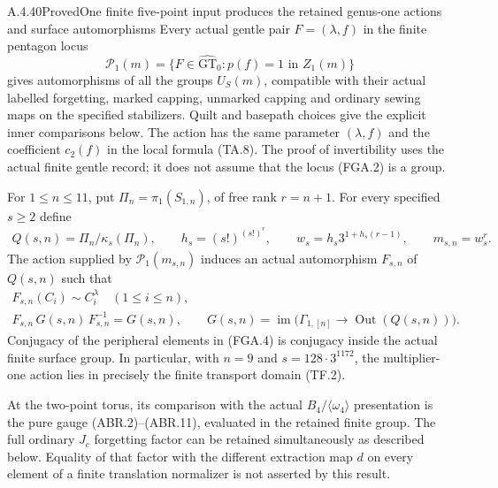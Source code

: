 \begin{result}{A.4.40}{Proved}{One finite five-point input produces the retained genus-one actions and surface automorphisms}
Every actual gentle pair $F=(\lambda,f)$ in the finite
pentagon locus
\[
      \mathcal P_1(m)=
      \{F\in\widehat{\mathrm{GT}}_0:
                       p(f)=1\text{ in }Z_1(m)\}
                                                               \tag{FGA.2}
\]
gives automorphisms of all the groups $U_S(m)$, compatible
with their actual labelled forgetting, marked capping,
unmarked capping and ordinary sewing maps on the specified
stabilizers.  Quilt and basepath choices give the explicit
inner comparisons below.  The action has the same parameter
$(\lambda,f)$ and the coefficient $c_2(f)$ in the local
formula (TA.8).  The proof of invertibility uses the actual
finite gentle record; it does not assume that the locus
(FGA.2) is a group.

For $1\leq n\leq11$, put $\Pi_n=\pi_1(S_{1,n})$, of
free rank $r=n+1$.  For every specified $s\geq2$ define
\[
 \begin{gathered}
 Q(s,n)=\Pi_n/\kappa_s(\Pi_n),\qquad
 h_s=(s!)^{(s!)^r},\qquad
 w_s=h_s3^{1+h_s(r-1)},\qquad m_{s,n}=w_s^r.
 \end{gathered}
                                                               \tag{FGA.3}
\]
The action supplied by $\mathcal P_1(m_{s,n})$ induces an
actual automorphism $F_{s,n}$ of $Q(s,n)$ such that
\[
 \begin{gathered}
 F_{s,n}(C_i)\sim C_i^\lambda\quad(1\leq i\leq n),\\
 F_{s,n}\,G(s,n)\,F_{s,n}^{-1}=G(s,n),\qquad
 G(s,n)=\operatorname{im}\bigl(
       \Gamma_{1,[n]}\to\operatorname{Out}(Q(s,n))\bigr).
 \end{gathered}
                                                               \tag{FGA.4}
\]
Conjugacy of the peripheral elements in (FGA.4) is
conjugacy inside the actual finite surface group.
In particular, with $n=9$ and
$s=128\cdot3^{1172}$, the multiplier-one action lies
in precisely the finite transport domain (TF.2).

At the two-point torus, its comparison with the actual
$B_4/\langle\omega_4\rangle$ presentation is the pure
gauge (ABR.2)--(ABR.11), evaluated in the retained finite
group.  The full ordinary $J_c$ forgetting factor can
be retained simultaneously as described below.  Equality
of that factor with the different extraction map $d$
on every element of a finite translation normalizer is
not asserted by this result.
\end{result}

